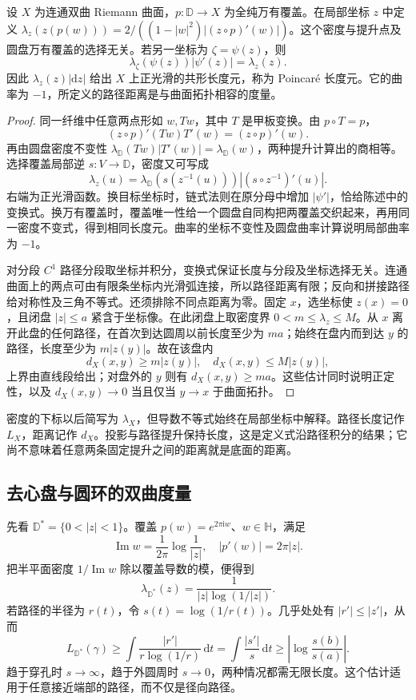 \begin{proposition}[曲面上的内在长度元]\label{b3:prop:13-metric-descent}
设 \(X\) 为连通双曲 Riemann 曲面，\(p:\mathbb D\to X\) 为全纯万有覆盖。在局部坐标 \(z\) 中定义 \(\lambda_z(z(p(w)))=2/((1-|w|^2)|(z\circ p)'(w)|)\)。这个密度与提升点及圆盘万有覆盖的选择无关。若另一坐标为 \(\zeta=\psi(z)\)，则
\[
 \lambda_\zeta(\psi(z))|\psi'(z)|=\lambda_z(z).
\]
因此 \(\lambda_z(z)|\mathrm dz|\) 给出 \(X\) 上正光滑的共形长度元，称为 Poincaré 长度元。它的曲率为 \(-1\)，所定义的路径距离是与曲面拓扑相容的度量。
\end{proposition}
\begin{proof}
同一纤维中任意两点形如 \(w,Tw\)，其中 \(T\) 是甲板变换。由 \(p\circ T=p\)，
\[
 (z\circ p)'(Tw)T'(w)=(z\circ p)'(w).
\]
再由圆盘密度不变性 \(\lambda_{\mathbb D}(Tw)|T'(w)|=\lambda_{\mathbb D}(w)\)，两种提升计算出的商相等。选择覆盖局部逆 \(s:V\to\mathbb D\)，密度又可写成
\[
 \lambda_z(u)=\lambda_{\mathbb D}(s(z^{-1}(u)))
                |(s\circ z^{-1})'(u)|.
\]
右端为正光滑函数。换目标坐标时，链式法则在原分母中增加 \(|\psi'|\)，恰给陈述中的变换式。换万有覆盖时，覆盖唯一性给一个圆盘自同构把两覆盖交织起来，再用同一密度不变式，得到相同长度元。曲率的坐标不变性及圆盘曲率计算说明局部曲率为 \(-1\)。

对分段 \(C^1\) 路径分段取坐标并积分，变换式保证长度与分段及坐标选择无关。连通曲面上的两点可由有限条坐标内光滑弧连接，所以路径距离有限；反向和拼接路径给对称性及三角不等式。还须排除不同点距离为零。固定 \(x\)，选坐标使 \(z(x)=0\)，且闭盘 \(|z|\le a\) 紧含于坐标像。在此闭盘上取密度界 \(0<m\le\lambda_z\le M\)。从 \(x\) 离开此盘的任何路径，在首次到达圆周以前长度至少为 \(ma\)；始终在盘内而到达 \(y\) 的路径，长度至少为 \(m|z(y)|\)。故在该盘内
\[
 d_X(x,y)\ge m|z(y)|,
 \quad d_X(x,y)\le M|z(y)|,
\]
上界由直线段给出；对盘外的 \(y\) 则有 \(d_X(x,y)\ge ma\)。这些估计同时说明正定性，以及 \(d_X(x,y)\to0\) 当且仅当 \(y\to x\) 于曲面拓扑。
\end{proof}
密度的下标以后简写为 \(\lambda_X\)，但导数不等式始终在局部坐标中解释。路径长度记作 \(L_X\)，距离记作 \(d_X\)。投影与路径提升保持长度，这是定义式沿路径积分的结果；它尚不意味着任意两条固定提升之间的距离就是底面的距离。

\subsection{去心盘与圆环的双曲度量}
\label{b3:subsec:130402}

先看 \(\mathbb D^*=\{0<|z|<1\}\)。覆盖 \(p(w)=e^{2\pi\mathrm i w}\)、\(w\in\mathbb H\)，满足
\[
 \operatorname{Im}w=\frac1{2\pi}\log\frac1{|z|},
 \quad |p'(w)|=2\pi|z|.
\]
把半平面密度 \(1/\operatorname{Im}w\) 除以覆盖导数的模，便得到
\[
 \lambda_{\mathbb D^*}(z)=\frac1{|z|\log(1/|z|)}.
\]
若路径的半径为 \(r(t)\)，令 \(s(t)=\log(1/r(t))\)。几乎处处有 \(|r'|\le|z'|\)，从而
\[
 L_{\mathbb D^*}(\gamma)
 \ge\int\frac{|r'|}{r\log(1/r)}\,\mathrm dt
 =\int\frac{|s'|}{s}\,\mathrm dt
 \ge\left|\log\frac{s(b)}{s(a)}\right|.
\]
趋于穿孔时 \(s\to\infty\)，趋于外圆周时 \(s\to0\)，两种情况都需无限长度。这个估计适用于任意接近端部的路径，而不仅是径向路径。

